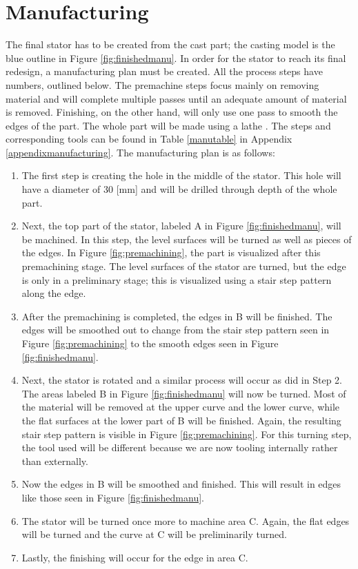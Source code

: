 \section{Manufacturing}
\label{manufacturing}
The final stator has to be created from the cast part; the casting model is the blue outline in Figure \ref{fig:finishedmanu}. In order for the stator to reach its final redesign, a manufacturing plan must be created. All the process steps have numbers, outlined below. The premachine steps focus mainly on removing material and will complete multiple passes until an adequate amount of material is removed. Finishing, on the other hand, will only use one pass to smooth the edges of the part. The whole part will be made using a lathe \cite{lathe}. The steps and corresponding tools can be found in Table \ref{manutable} in Appendix \ref{appendixmanufacturing}. The manufacturing plan is as follows:
\begin{enumerate}
\item The first step is creating the hole in the middle of the stator. This hole will have a diameter of 30 [mm] and will be drilled through depth of the whole part.
\item Next, the top part of the stator, labeled A in Figure \ref{fig:finishedmanu}, will be machined. In this step, the level surfaces will be turned as well as pieces of the edges. In Figure \ref{fig:premachining}, the part is visualized after this premachining stage. The level surfaces of the stator are turned, but the edge is only in a preliminary stage; this is visualized using a stair step pattern along the edge.
\item After the premachining is completed, the edges in B will be finished. The edges will be smoothed out to change from the stair step pattern seen in Figure \ref{fig:premachining} to the smooth edges seen in Figure \ref{fig:finishedmanu}.
\item Next, the stator is rotated and a similar process will occur as did in Step 2. The areas labeled B in Figure \ref{fig:finishedmanu} will now be turned. Most of the material will be removed at the upper curve and the lower curve, while the flat surfaces at the lower part of B will be finished. Again, the resulting stair step pattern is visible in Figure \ref{fig:premachining}. For this turning step, the tool used will be different because we are now tooling internally rather than externally.
\item Now the edges in B will be smoothed and finished. This will result in edges like those seen in Figure \ref{fig:finishedmanu}.
\item The stator will be turned once more to machine area C. Again, the flat edges will be turned and the curve at C will be preliminarily turned.
\item Lastly, the finishing will occur for the edge in area C. 
\end{enumerate}

